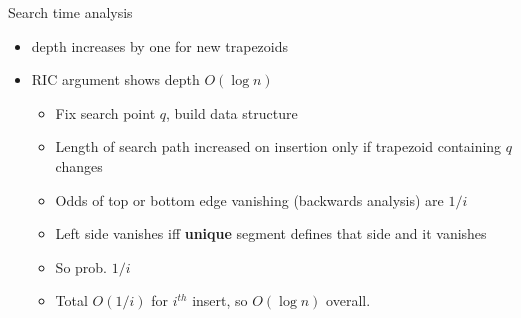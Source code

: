 \documentclass{article}
\begin{document}
Search time analysis
\begin{itemize}
\item depth increases by one for new trapezoids
\item RIC argument shows depth $O(\log n)$
\begin{itemize}
\item Fix search point $q$, build data structure
\item Length of search path increased on insertion only if trapezoid
  containing $q$ changes
\item Odds of top or bottom edge vanishing (backwards analysis) are $1/i$
\item Left side vanishes iff \textbf{unique} segment defines that side and
  it vanishes
\item So prob. $1/i$
\item Total $O(1/i)$ for $i^{th}$ insert, so $O(\log n)$ overall.
\end{itemize}
\end{itemize}
\end{document}
